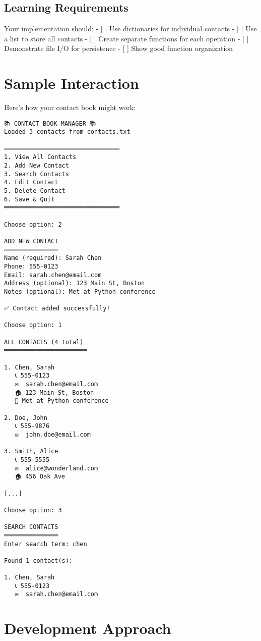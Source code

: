 \documentclass[
  letterpaper,
  DIV=11,
  numbers=noendperiod,
  oneside]{scrreprt}
\begin{document}
\subsection{Learning Requirements}\label{learning-requirements-5}

Your implementation should: - {[} {]} Use dictionaries for individual
contacts - {[} {]} Use a list to store all contacts - {[} {]} Create
separate functions for each operation - {[} {]} Demonstrate file I/O for
persistence - {[} {]} Show good function organization

\section{Sample Interaction}\label{sample-interaction-5}

Here's how your contact book might work:

\begin{verbatim}
📚 CONTACT BOOK MANAGER 📚
Loaded 3 contacts from contacts.txt

════════════════════════════════
1. View All Contacts
2. Add New Contact
3. Search Contacts
4. Edit Contact
5. Delete Contact
6. Save & Quit
════════════════════════════════

Choose option: 2

ADD NEW CONTACT
═══════════════
Name (required): Sarah Chen
Phone: 555-0123
Email: sarah.chen@email.com
Address (optional): 123 Main St, Boston
Notes (optional): Met at Python conference

✅ Contact added successfully!

Choose option: 1

ALL CONTACTS (4 total)
═══════════════════════

1. Chen, Sarah
   📞 555-0123
   ✉️  sarah.chen@email.com
   🏠 123 Main St, Boston
   📝 Met at Python conference

2. Doe, John
   📞 555-9876
   ✉️  john.doe@email.com

3. Smith, Alice
   📞 555-5555
   ✉️  alice@wonderland.com
   🏠 456 Oak Ave
   
[...]

Choose option: 3

SEARCH CONTACTS
═══════════════
Enter search term: chen

Found 1 contact(s):

1. Chen, Sarah
   📞 555-0123
   ✉️  sarah.chen@email.com
\end{verbatim}

\section{Development Approach}\label{development-approach-5}
\end{document}
